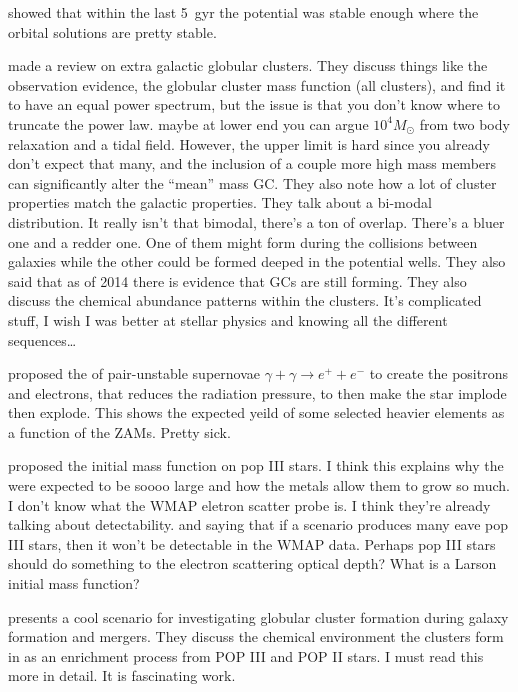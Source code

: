     \citet{2023A&A...673A.152I} showed that within the last 5~gyr the potential was stable enough where the orbital solutions are pretty stable. 
    
    \citet{2006ARA&A..44..193B} made a review on extra galactic globular clusters. They discuss things like the observation evidence, the globular cluster mass function (all clusters), and find it to have an equal power spectrum, but the issue is that you don't know where to truncate the power law. maybe at lower end you can argue $10^4 M_\odot$ from two body relaxation and a tidal field. However, the upper limit is hard since you already don't expect that many, and the inclusion of a couple more high mass members can significantly alter the ``mean'' mass GC. They also note how a lot of cluster properties match the galactic properties. They talk about a bi-modal distribution. It really isn't that bimodal, there's a ton of overlap. There's a bluer one and a redder one. One of them might form during the collisions between galaxies while the other could be formed deeped in the potential wells. They also said that as of 2014 there is evidence that GCs are still forming. They also discuss the chemical abundance patterns within the clusters. It's complicated stuff, I wish I was better at stellar physics and knowing all the different sequences\dots
    
    \citet{2002ApJ...571...30S} proposed the of pair-unstable supernovae $\gamma + \gamma \rightarrow e^{+} + e^{-}$ to create the positrons and electrons, that reduces the radiation pressure, to then make the star implode then explode. This shows the expected yeild of some selected heavier elements as a function of the ZAMs. Pretty sick. 
    
    \citet{2006MNRAS.369..825S} proposed the initial mass function on pop III stars. I think this explains why the were expected to be soooo large and how the metals allow them to grow so much. I don't know what the  WMAP eletron scatter probe is. I think they're already talking about detectability. and saying that if a scenario produces many eave pop III stars, then it won't be detectable in the WMAP data. Perhaps pop III stars should do something to the electron scattering optical depth? What is a Larson initial mass function?  

    \citet{2025MNRAS.540.1235C} presents a cool scenario for investigating globular cluster formation during galaxy formation and mergers. They discuss the chemical environment the clusters form in as an enrichment process from POP III and POP II stars. I must read this more in detail. It is fascinating work. 






